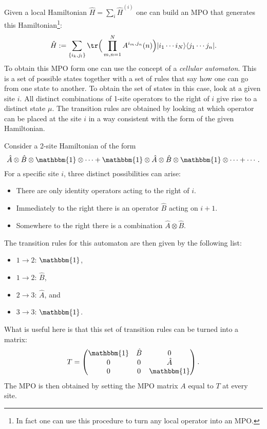     \begin{method}
        Given a local Hamiltonian $\hat{H}=\sum_i\hat{H}^{(i)}$ one can build an MPO that generates this Hamiltonian\footnote{In fact one can use this procedure to turn any local operator into an MPO.}:
        \begin{gather}
            \hat{H} := \sum_{\{i_k,j_l\}}\tr\Big(\prod_{m,n=1}^NA^{i_m,j_n}(n)\Big)|i_1\cdots i_N\rangle\langle j_1\cdots j_n|.
        \end{gather}
        To obtain this MPO form one can use the concept of a \textit{cellular automaton}. This is a set of possible states together with a set of rules that say how one can go from one state to another. To obtain the set of states in this case, look at a given site $i$. All distinct combinations of 1-site operators to the right of $i$ give rise to a distinct state $\mu$. The transition rules are obtained by looking at which operator can be placed at the site $i$ in a way consistent with the form of the given Hamiltonian.
    \end{method}
    \begin{example}
        Consider a 2-site Hamiltonian of the form \[\hat{A}\otimes\hat{B}\otimes\mathbbm{1}\otimes\cdots+\mathbbm{1}\otimes\hat{A}\otimes\hat{B}\otimes\mathbbm{1}\otimes\cdots+\cdots.\] For a specific site $i$, three distinct possibilities can arise:
        \begin{itemize}
            \item There are only identity operators acting to the right of $i$.
            \item Immediately to the right there is an operator $\hat{B}$ acting on $i+1$.
            \item Somewhere to the right there is a combination $\hat{A}\otimes\hat{B}$.
        \end{itemize}
        The transition rules for this automaton are then given by the following list:
        \begin{itemize}
            \item $1\rightarrow2$: $\mathbbm{1}$,
            \item $1\rightarrow2$: $\hat{B}$,
            \item $2\rightarrow3$: $\hat{A}$, and
            \item $3\rightarrow3$: $\mathbbm{1}$.
        \end{itemize}
        What is useful here is that this set of transition rules can be turned into a matrix: \[T=\begin{pmatrix}\mathbbm{1}&\hat{B}&0\\0&0&\hat{A}\\0&0&\mathbbm{1}\end{pmatrix}.\] The MPO is then obtained by setting the MPO matrix $A$ equal to $T$ at every site.
    \end{example}

